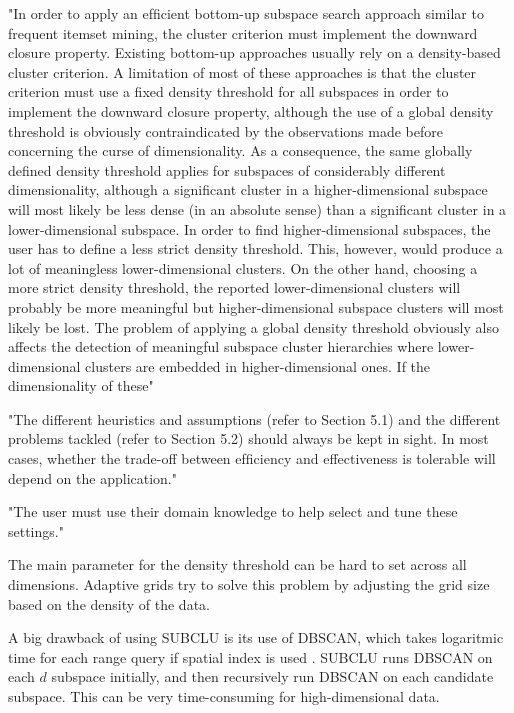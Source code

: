"In order to apply an efﬁcient bottom-up subspace search approach similar to frequent itemset mining, the cluster criterion must implement the downward closure property. Existing bottom-up approaches usually rely on a density-based cluster criterion. A limitation of most of these approaches is that the cluster criterion must use a ﬁxed density threshold for all subspaces in order to implement the downward closure property, although the use of a global density threshold is obviously contraindicated by the observations made before concerning the curse of dimensionality. As a consequence, the same globally deﬁned density threshold applies for subspaces of considerably different dimensionality, although a signiﬁcant cluster in a higher-dimensional subspace will most likely be less dense (in an absolute sense) than a signiﬁcant cluster in a lower-dimensional subspace. In order to ﬁnd higher-dimensional subspaces, the user has to deﬁne a 
less strict density threshold. This, however, would produce a lot of meaningless lower-dimensional clusters. On the other hand, choosing a more strict density threshold, the reported lower-dimensional clusters will probably be more meaningful but higher-dimensional subspace clusters will most likely be lost. The 
problem of applying a global density threshold obviously also affects the detection of meaningful subspace cluster hierarchies where lower-dimensional clusters are embedded in higher-dimensional ones. If the dimensionality of these" \cite[p.1:48]{kriegel-2009}

"The different heuristics and assumptions (refer to Section 5.1) and the different problems tackled (refer to Section 5.2) should always be kept in sight. In most cases, whether the trade-off between efﬁciency and effectiveness is tolerable will depend on the application." \cite[p.1:50]{kriegel-2009}

"The user must use their domain knowledge to help select and tune these settings." \cite{parsons-2-2004}

The main parameter for the density threshold can be hard to set across all dimensions. Adaptive grids try to solve this problem by adjusting the grid size based on the density of the data.

A big drawback of using SUBCLU is its use of DBSCAN, which takes logaritmic time for each range query if spatial index is used \cite[p.~473]{han-2011}. SUBCLU runs DBSCAN on each $d$ subspace initially, and then recursively run DBSCAN on each candidate subspace. This can be very time-consuming for high-dimensional data. 

